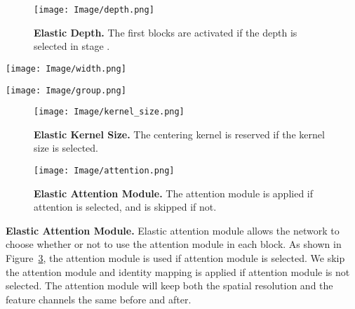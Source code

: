 \documentclass[final]{cvpr}
\begin{document}
\begin{figure}[tb]
	\centering
	\texttt{[image: Image/depth.png]}
	\caption{\textbf{Elastic Depth.} The first  blocks are activated if the depth  is selected in stage .}
	\label{fig:depth}
	\vspace{10pt}
\end{figure}

\begin{figure*}[tb]
	\centering
	\texttt{[image: Image/width.png]}
	\caption{\textbf{Elastic Width.} Given the input channels  and kernel size , the first  output channels out of  is kept if the width W is selected. The filter is tailored from the shape  to .}
	\label{fig:width}
	\vspace{10pt}
\end{figure*}


\begin{figure*}[h]
	\centering
	\texttt{[image: Image/group.png]}
	\caption{\textbf{Elastic Group Number.} An example of Group=2 is illustrated in the figure. Given the input channels , output channels , and kernel size , the filter is tailored from the shape  to . Two groups of filters with shape  are applied and are concatenated in the dimension of output channels.}
	\label{fig:group}
	\vspace{10pt}
\end{figure*}


\begin{figure}[tb]
	\centering
	\texttt{[image: Image/kernel\_size.png]}
	\caption{\textbf{Elastic Kernel Size.} The centering  kernel is reserved if the kernel size  is selected.}
	\label{fig:ks}
	\vspace{10pt}
\end{figure}

\begin{figure}[tb]
	\centering
	\texttt{[image: Image/attention.png]}
	\caption{\textbf{Elastic Attention Module.} The attention module is applied if attention is selected, and is skipped if not.}
	\label{fig:attention}
	\vspace{10pt}
\end{figure}


\textbf{Elastic Attention Module.}
Elastic attention module allows the network to choose whether or not to use the attention module in each block. As shown in Figure~\ref{fig:attention}, the attention module is used if attention module is selected. We skip the attention module and identity mapping is applied if attention module is not selected. The attention module will keep both the spatial resolution and the feature channels the same before and after.
\end{document}

